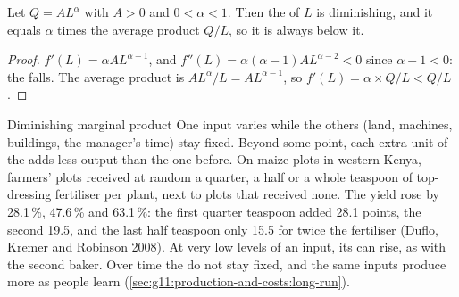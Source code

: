 \begin{proposition}\label{prop:g11:production-and-costs:power}
Let $Q = A L^{\alpha}$ with $A > 0$ and $0 < \alpha < 1$. Then the  of $L$ is diminishing, and it equals $\alpha$ times the average product
$Q/L$, so it is always below it.
\end{proposition}
\begin{proof}
$f'(L) = \alpha A L^{\alpha - 1}$, and $f''(L) = \alpha(\alpha - 1) A L^{\alpha - 2} < 0$ since $\alpha - 1 < 0$: the  falls. The average product is
$A L^{\alpha}/L = A L^{\alpha - 1}$, so $f'(L) = \alpha \times Q/L < Q/L$.
\end{proof}

\begin{model}{Diminishing marginal product}
\assumes One input varies while the others (land, machines, buildings, the manager's time) stay fixed.
\predicts Beyond some point, each extra unit of the  adds less output than the one before.
\tested On maize plots in western Kenya, farmers' plots received at random a quarter, a half or a whole teaspoon of top-dressing fertiliser per plant, next to
  plots that received none. The yield rose by 28.1\,\%, 47.6\,\% and 63.1\,\%: the first quarter teaspoon added 28.1 points, the second 19.5, and the last half
  teaspoon only 15.5 for twice the fertiliser (Duflo, Kremer and Robinson 2008).
\breaks At very low levels of an input, its  can rise, as with the second baker. Over time the  do not stay fixed, and the same
  inputs produce more as people learn (\cref{sec:g11:production-and-costs:long-run}).
\end{model}

